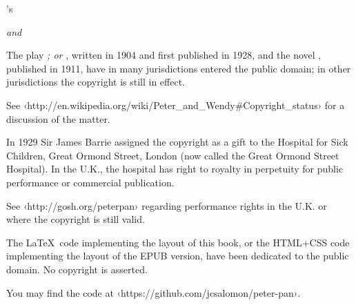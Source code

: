 
\pagestyle{empty}


\vspace*{\fill}
\begin{center}
\HUGE \thetitle
\end{center}
\vspace*{\fill}
\cleardoublepage


\vspace*{\fill}
\begin{center}
\Large\theauthor’s\par
\HUGE\thetitle
\end{center}
\begin{center}\huge\thebooktitle\end{center}
\begin{center}\huge\emph{\Large and}\end{center}
\begin{center}\huge\theplaytitle\end{center}
\vspace*{\fill}
\clearpage


\begingroup
\footnotesize
\setlength{\parindent}{0pt}
\setlength{\parskip}{\baselineskip}

\ccPublicDomain\quad
The play \emph{\thetitle; or \theplaytitle}, written in 1904 and first published in 1928,
and the novel \emph{\thebooktitle}, published in 1911,
have in many jurisdictions entered the public domain;
in other jurisdictions the copyright is still in effect.

See ‹http://en.wikipedia.org/wiki/Peter\_and\_Wendy\#Copyright\_status›
for a discussion of the matter.

In 1929 Sir James Barrie assigned the copyright as a gift
to the Hospital for Sick Children, Great Ormond Street, London
(now called the Great Ormond Street Hospital).
In the U.K., the hospital has right to royalty in perpetuity
for public performance or commercial publication.

See ‹http://gosh.org/peterpan› regarding performance rights
in the U.K. or where the copyright is still valid.

\ccZero\quad
The \LaTeX\ code implementing the layout of this book,
or the HTML+CSS code implementing the layout of the EPUB version,
have been dedicated to the public domain.
No copyright is asserted.

You may find the code at ‹https://github.com/jcsalomon/peter-pan›.

\endgroup
\cleardoublepage

\tableofcontents*

\endinput
